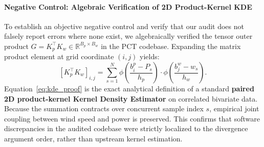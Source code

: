 \paragraph{Negative Control: Algebraic Verification of 2D Product-Kernel KDE}
To establish an objective negative control and verify that our audit does not falsely report errors where none exist, we algebraically verified the tensor outer product $G = K_p^\top K_w \in \mathbb{R}^{B_p \times B_w}$ in the PCT codebase. Expanding the matrix product element at grid coordinate $(i,j)$ yields:
\begin{equation}
\left[ K_p^\top K_w \right]_{i,j} = \sum_{s=1}^N \phi\left( \frac{b_i^p - P_s}{h_p} \right) \cdot \phi\left( \frac{b_j^w - w_s}{h_w} \right).
\label{eq:kde_proof}
\end{equation}
Equation~\eqref{eq:kde_proof} is the exact analytical definition of a standard \textbf{paired 2D product-kernel Kernel Density Estimator} on correlated bivariate data. Because the summation contracts over concurrent sample index $s$, empirical joint coupling between wind speed and power is preserved. This confirms that software discrepancies in the audited codebase were strictly localized to the divergence argument order, rather than upstream kernel estimation.
